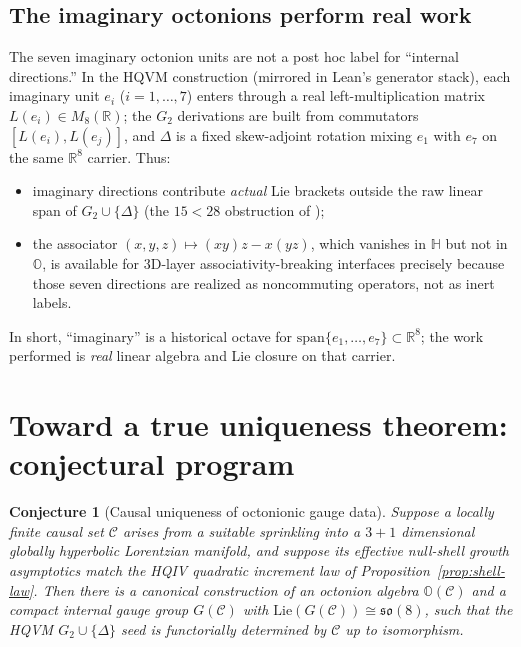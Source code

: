 \documentclass[11pt]{amsart}
\newtheorem{conjecture}[theorem]{Conjecture}
\begin{document}
\subsection[Imaginary octonions perform real work]{The imaginary octonions perform real work}

The seven imaginary octonion units are not a post hoc label for ``internal directions.'' In the HQVM construction (mirrored in Lean's generator stack), each imaginary unit \(e_i\) (\(i=1,\dots,7\)) enters through a real left-multiplication matrix \(L(e_i)\in M_8(\mathbb{R})\); the \(G_2\) derivations are built from commutators \([L(e_i),L(e_j)]\), and \(\Delta\) is a fixed skew-adjoint rotation mixing \(e_1\) with \(e_7\) on the same \(\mathbb{R}^8\) carrier. Thus:
\begin{itemize}
  \item imaginary directions contribute \emph{actual} Lie brackets outside the raw linear span of \(G_2\cup\{\Delta\}\) (the \(15<28\) obstruction of \cite{hqiv-so8-paper});
  \item the associator \((x,y,z)\mapsto (xy)z-x(yz)\), which vanishes in \(\mathbb{H}\) but not in \(\mathbb{O}\), is available for \(3\)D-layer associativity-breaking interfaces precisely because those seven directions are realized as noncommuting operators, not as inert labels.
\end{itemize}
In short, ``imaginary'' is a historical octave for \(\mathrm{span}\{e_1,\dots,e_7\}\subset\mathbb{R}^8\); the work performed is \emph{real} linear algebra and Lie closure on that carrier.

\section{Toward a true uniqueness theorem: conjectural program}
\label{sec:uniqueness-conjecture}

\begin{conjecture}[Causal uniqueness of octonionic gauge data]
\label{conj:uniqueness}
Suppose a locally finite causal set \(\mathcal{C}\) arises from a suitable sprinkling into a \(3{+}1\) dimensional globally hyperbolic Lorentzian manifold, and suppose its effective null-shell growth asymptotics match the HQIV quadratic increment law of Proposition~\ref{prop:shell-law}. Then there is a canonical construction of an octonion algebra \(\mathbb{O}(\mathcal{C})\) and a compact internal gauge group \(G(\mathcal{C})\) with \(\mathrm{Lie}(G(\mathcal{C}))\cong \mathfrak{so}(8)\), such that the HQVM \(G_2\cup\{\Delta\}\) seed is functorially determined by \(\mathcal{C}\) up to isomorphism.
\end{conjecture}
\end{document}
